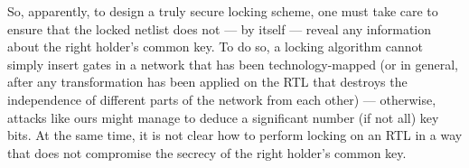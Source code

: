 So, apparently, to design a truly secure locking scheme, one must take care to ensure that the locked netlist does not --- by itself --- reveal any information about the right holder's common key. To do so, a locking algorithm cannot simply insert gates in a network that has been technology-mapped (or in general, after any transformation has been applied on the RTL that destroys the independence of different parts of the network from each other) --- otherwise, attacks like ours might manage to deduce a significant number (if not all) key bits. At the same time, it is not clear how to perform locking on an RTL in a way that does not compromise the secrecy of the right holder's common key.



